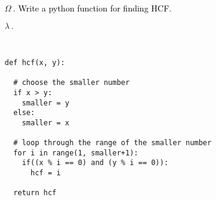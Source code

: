 \documentclass{article}
\begin{document}
\ttfamily
\sloppy
\vspace*{\fill}
\begin{itemize}
	\item[\textcolor{black}{$\Omega ~.$}]\textcolor{black}{Write a python function for finding HCF.}
	\item[\textcolor{BLUE20}{$\lambda ~.$}]
\begin{verbatim}


def hcf(x, y):
  
  # choose the smaller number
  if x > y:
    smaller = y
  else:
    smaller = x
  
  # loop through the range of the smaller number
  for i in range(1, smaller+1):
    if((x % i == 0) and (y % i == 0)):
      hcf = i
      
  return hcf

\end{verbatim}
\end{itemize}
\vspace*{\fill}
\end{document}
